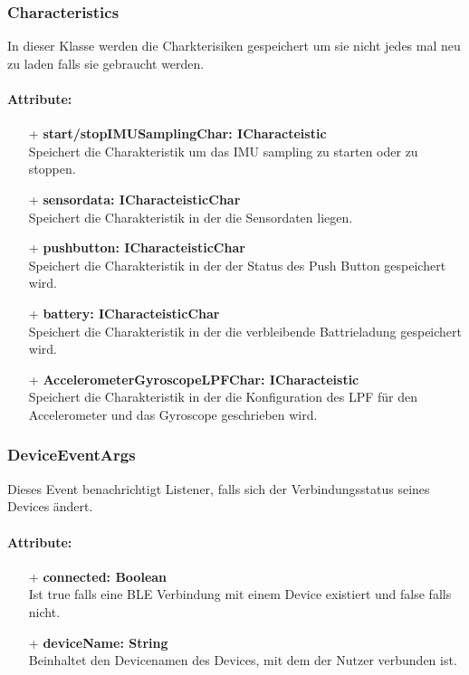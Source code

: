 \documentclass[a4paper,12pt]{article}
\begin{document}
\subsubsection{Characteristics}
In dieser Klasse werden die Charkterisiken gespeichert um sie nicht jedes mal neu zu laden falls sie gebraucht werden.

\paragraph{Attribute:}
\begin{itemize}
	\item[+] \textbf{start/stopIMUSamplingChar: ICharacteistic}\\Speichert die Charakteristik um das IMU sampling zu starten oder zu stoppen.
	\item[+] \textbf{sensordata: ICharacteisticChar}\\Speichert die Charakteristik in der die Sensordaten liegen.
	\item[+] \textbf{pushbutton: ICharacteisticChar}\\Speichert die Charakteristik in der der Status des Push Button gespeichert wird.
	\item[+] \textbf{battery: ICharacteisticChar}\\Speichert die Charakteristik in der die verbleibende Battrieladung gespeichert wird.
	\item[+] \textbf{AccelerometerGyroscopeLPFChar: ICharacteistic}\\Speichert die Charakteristik in der die Konfiguration des LPF für den Accelerometer und das Gyroscope geschrieben wird.
\end{itemize}


\subsubsection{DeviceEventArgs}
Dieses Event benachrichtigt Listener, falls sich der Verbindungsstatus seines Devices ändert.
\paragraph{Attribute:}
\begin{itemize}
	\item[+] \textbf{connected: Boolean}\\Ist true falls eine BLE Verbindung mit einem Device existiert und false falls nicht.
	\item[+] \textbf{deviceName: String}\\Beinhaltet den Devicenamen des Devices, mit dem der Nutzer verbunden ist. %
\end{itemize}
\end{document}
